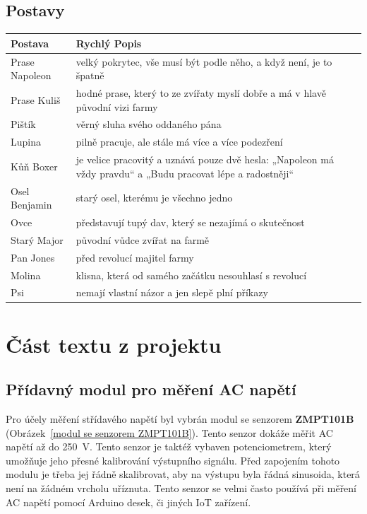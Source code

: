 \documentclass{article}
\newcommand{\sectionbreak}{\clearpage}
\begin{document}
\subsection{Postavy}
\begin{tabular}{|l|p{10cm}|}
  \hline
  {\bf Postava} & {\bf Rychlý Popis} \\
  \hline \hline
  Prase Napoleon    & velký pokrytec, vše musí být podle něho, a když není, je to špatně \\
  Prase Kuliš       & hodné prase, který to ze zvířaty myslí dobře a má v hlavě původní vizi farmy\\
  Pištík            & věrný sluha svého oddaného pána \\
  Lupina            & pilně pracuje, ale stále má více a více podezření\\
  Kůň Boxer         & je velice pracovitý a uznává pouze dvě hesla: „Napoleon má vždy pravdu“ a „Budu pracovat lépe a radostněji“\\
  Osel Benjamin     & starý osel, kterému je všechno jedno\\
  Ovce              & představují tupý dav, který se nezajímá o skutečnost\\
  Starý Major       & původní vůdce zvířat na farmě\\
  Pan Jones         & před revolucí majitel farmy\\
  Molina            & klisna, která od samého začátku nesouhlasí s revolucí\\
  Psi               & nemají vlastní názor a jen slepě plní příkazy \\
  
  \hline
\end{tabular}

\sectionbreak

\section{Část textu z projektu}
\subsection{Přídavný modul pro měření AC napětí}

Pro účely měření střídavého napětí byl vybrán modul se senzorem 
\textbf{ZMPT101B} (Obrázek~\ref{modul se senzorem ZMPT101B}). Tento senzor dokáže měřit AC napětí až do 250~V. 
Tento senzor je taktéž vybaven potenciometrem, který umožňuje jeho přesné kalibrování výstupního signálu. Před 
zapojením tohoto modulu je třeba jej řádně skalibrovat, aby na výstupu byla řádná sinusoida, která není na 
žádném vrcholu uříznuta. Tento senzor se velmi často používá při měření AC napětí pomocí Arduino desek, či 
jiných IoT zařízení.
\end{document}
